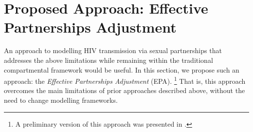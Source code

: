 \section{Proposed Approach: Effective Partnerships Adjustment}\label{foi.prop}
An approach to modelling HIV transmission via sexual partnerships that addresses the above limitations while remaining
within the traditional compartmental framework would be useful.
In this section, we propose such an approach: %
the \emph{Effective Partnerships Adjustment} (EPA).%
\footnote{A preliminary version of this approach was presented in \cite{Knight2022smdm}.}
That is, this approach overcomes
the main limitations of prior approaches described above,
without the need to change modelling frameworks.
